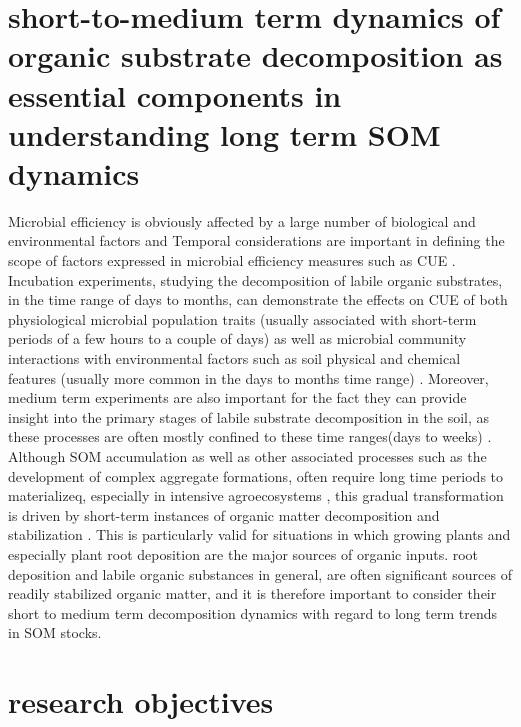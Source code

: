 \documentclass[12pt]{report}
\begin{document}
\section{short-to-medium term dynamics of organic substrate decomposition as essential components in understanding long term SOM dynamics}
	
		Microbial efficiency is obviously affected by a large number of biological and environmental factors and Temporal considerations are important in defining the scope of factors expressed in microbial efficiency measures such as CUE \citep{kallenbach2019}. Incubation experiments, studying the decomposition of labile organic substrates, in the time range of days to months,  can demonstrate the effects on CUE of both physiological microbial population traits (usually associated with short-term periods of a few hours to a couple of days) as well as microbial community interactions with environmental factors such as soil physical and chemical features (usually more common in the days to months time range) \citep{geyer2016, manzoni2018}. Moreover, medium term experiments are also important for the fact they can provide insight into the primary stages of labile substrate decomposition in the soil, as these processes are often mostly confined to these time ranges(days to weeks) \citep{blagodatskaya2011, schneckenberger2008, tian2015}. Although SOM accumulation as well as other associated processes such as the development of complex aggregate formations, often require long time periods to materializeq, especially in intensive agroecosystems \citep{grandy2007}, this gradual transformation is driven by short-term instances of organic matter decomposition and stabilization \citep{kuzyakov2015}. This is particularly valid for situations in which growing plants and especially plant root deposition are the major sources of organic inputs. root deposition and labile organic substances in general, are often significant sources of readily stabilized organic matter, and it is therefore important to consider their short to medium term decomposition dynamics with regard to long term trends in SOM stocks. 
		
\section{research objectives}
	
\end{document}

